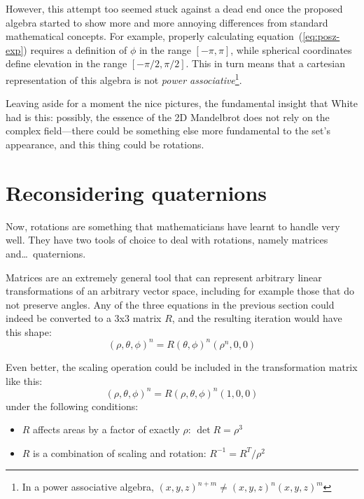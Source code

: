 \documentclass{article}
\begin{document}
\noindent
However, this attempt too seemed stuck against a dead end once the
proposed algebra started to show more and more annoying differences
from standard mathematical concepts.  For example, properly
calculating equation~(\ref{eq:posz-exp}) requires a definition of
$\phi$ in the range $[-\pi,\pi]$, while spherical coordinates define
elevation in the range $[-\pi/2,\pi/2]$.  This in turn means that a
cartesian representation of this algebra is not \emph{power
  associative}\footnote{In a power associative algebra, $(x,y,z)^{n+m}
  \ne (x,y,z)^n (x,y,z)^m$}.

Leaving aside for a moment the nice pictures, the fundamental insight
that White had is this: possibly, the essence of the 2D Mandelbrot does
not rely on the complex field---there could be something else more
fundamental to the set's appearance, and this thing could be rotations.

\section{Reconsidering quaternions}

Now, rotations are something that mathematicians have learnt to handle
very well.  They have two tools of choice to deal with rotations, namely
matrices and\dots\ quaternions.

Matrices are an extremely general tool that can represent arbitrary
linear transformations of an arbitrary vector space, including for
example those that do not preserve angles.  Any of the three equations
in the previous section could indeed be converted to a 3x3 matrix $R$,
and the resulting iteration would have this shape:
\begin{equation*}
  (\rho,\theta,\phi)^n = R(\theta,\phi)^n (\rho^n,0,0)
\end{equation*}

\noindent
Even better, the scaling operation could be included in the transformation
matrix like this:
\begin{equation*}
  (\rho,\theta,\phi)^n = R(\rho,\theta,\phi)^n (1,0,0)
\end{equation*}
\noindent
under the following conditions:
\begin{itemize}
\item $R$ affects areas by a factor of exactly $\rho$: $\det R = \rho^3$
\item $R$ is a combination of scaling and rotation: $R^{-1} = R^T / \rho^2$
\end{itemize}
\end{document}
